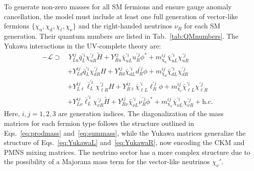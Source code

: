 To generate non-zero masses for all SM fermions and ensure gauge anomaly cancellation, the model must include at least one full generation of vector-like fermions $\{\chi_\mathrm{u}, \chi_\mathrm{d}, \chi_\mathrm{\ell}, \chi_\mathrm{\nu}\}$ and the right-handed neutrinos $\nu_R$ for each SM generation. Their quantum numbers are listed in Tab.~\ref{tab:QMnumbers}. The Yukawa interactions in the UV-complete theory are:
\begin{equation}
    \begin{aligned}
        -\mathcal{L} \supset&\,
        Y_{L u}^{ij} \bar{q}_L^{\prime i} \chi_{u R}^{\prime j} \widetilde{H}
        + Y_{R u}^{ij} \bar{\chi}_{u L}^{\prime i} u_R^{\prime j} \phi^*
        + m_{\chi_\mathrm{u}}^{ij} \bar{\chi}_{u L}^{\prime i} \chi_{u R}^{\prime j} \\
        &+ Y_{L d}^{ij} \bar{q}_L^{\prime i} \chi_{d R}^{\prime j} H
        + Y_{R d}^{ij} \bar{\chi}_{d L}^{\prime i} d_R^{\prime j} \phi
        + m_{\chi_d}^{ij} \bar{\chi}_{d L}^{\prime i} \chi_{d R}^{\prime j} \\
        &+ Y_{L \ell}^{ij} \bar{\ell}_L^{\prime i} \chi_{\ell R}^{\prime j} H
        + Y_{R \ell}^{ij} \bar{\chi}_{\ell L}^{\prime i} \ell_R^{\prime j} \phi
        + m_{\chi_\ell}^{ij} \bar{\chi}_{\ell L}^{\prime i} \chi_{\ell R}^{\prime j} \\
        &+ Y_{L \nu}^{ij} \bar{\ell}_L^{\prime i} \chi_{\nu R}^{\prime j} \widetilde{H}
        + Y_{R \nu}^{ij} \bar{\chi}_{\nu L}^{\prime i} \nu_R^{\prime j} \phi^*
        + m_{\chi_\nu}^{ij} \bar{\chi}_{\nu L}^{\prime i} \chi_{\nu R}^{\prime j}
        + \text{h.c.}
    \end{aligned}
\end{equation}
Here, $i, j = 1,2,3$ are generation indices. The diagonalization of the mass matrices for each fermion type follows the structure outlined in Eqs.~\eqref{eq:prodmass} and~\eqref{eq:summass}, while the Yukawa matrices generalize the structure of Eqs.~\eqref{eq:YukawaL} and~\eqref{eq:YukawaR}, now encoding the CKM and PMNS mixing matrices. The neutrino sector has a more complex structure due to the possibility of a Majorana mass term for the vector-like neutrinos $\chi_\nu'$.

